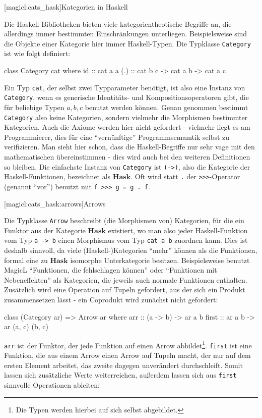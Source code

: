\documentclass[a4paper, bibgerm]{book}
\newcommand\icode[1]{\lstinline?#1?}
\newcommand\lsection{}
\newcommand\lsubsection{}
\begin{document}
\lsection[magicl:cats_hask]{Kategorien in Haskell}

Die Haskell-Bibliotheken bieten viele kategorientheotische Begriffe an,
die allerdings immer bestimmten Einschränkungen
unterliegen. Beispielsweise sind die Objekte einer Kategorie hier immer
Haskell-Typen. Die Typklasse \icode{Category} ist wie folgt definiert:
\begin{code}
class Category cat where
  id   :: cat a a
  (.)  :: cat b c -> cat a b -> cat a c
\end{code}
Ein Typ \icode{cat}, der selbst zwei Typparameter benötigt, ist also eine
Instanz von \icode{Category}, wenn es generische Identitäts- und
Kompositionsoperatoren gibt, die für beliebige Typen $a,b,c$ benutzt
werden können. Genau genommen bestimmt \icode{Category} also keine
Kategorien, sondern vielmehr die Morphismen bestimmter Kategorien. Auch
die Axiome werden hier nicht gefordert - vielmehr liegt es am
Programmierer, dies für eine "`vernünftige"' Programmsemamtik selbst zu
verifizieren. Man sieht hier schon, dass die Haskell-Begriffe nur sehr
vage mit den mathematischen übereinstimmen - dies wird auch bei den
weiteren Definitionen so bleiben. Die einfachste Instanz von
\icode{Category} ist \icode{(->)}, also die Kategorie der
Haskell-Funktionen, bezeichnet als $\mathbf{Hask}$.
Oft wird statt \icode{.} der \icode{>>>}-Operator (genannt "`vor"') %
benutzt mit \icode{f >>> g = g . f}. %

\lsubsection[magicl:cats_hask:arrows]{Arrows}

Die Typklasse \icode{Arrow} beschreibt (die Morphismen von) Kategorien,
für die ein Funktor aus der Kategorie $\mathbf{Hask}$ existiert, wo man
also jeder Haskell-Funktion vom Typ \icode{a -> b} einen Morphismus vom
Typ \icode{cat a b} zuordnen kann. Dies ist deshalb sinnvoll, da viele
(Haskell-)Kategorien "`mehr"' können als die Funktionen, formal eine zu
$\mathbf{Hask}$ isomorphe Unterkategorie besitzen. Beispielsweise
benutzt MagicL "`Funktionen, die fehlschlagen können"' oder "`Funktionen
mit Nebeneffekten"' als Kategorien, die jeweils auch normale Funktionen
enthalten. Zusätzlich wird eine Operation auf Tupeln gefordert, aus der
sich ein Produkt zusammensetzen lässt - ein Coprodukt wird zunächst nicht gefordert:
\begin{code}
class (Category ar) => Arrow ar where
  arr   :: (a -> b) -> ar a b
  first :: ar a b  -> ar (a, c) (b, c)
\end{code}
\icode{arr} ist der Funktor, der jede Funktion auf einen Arrow
abbildet\footnote{Die Typen werden hierbei auf sich selbst abgebildet.}.
\icode{first} ist eine Funktion, die aus einem Arrow einen Arrow auf
Tupeln macht, der nur auf dem ersten Element arbeitet, das zweite
dagegen unverändert durchschleift. Somit lassen sich zusätzliche Werte
weiterreichen, außerdem lassen sich aus \icode{first} sinnvolle
Operationen ableiten:
\end{document}
